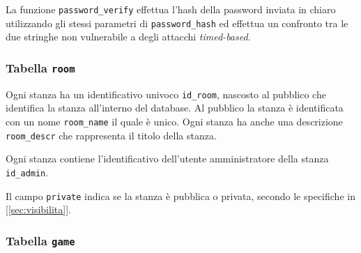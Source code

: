 La funzione \texttt{password\_verify} effettua l'hash della password inviata in chiaro utilizzando gli stessi parametri di \texttt{password\_hash} ed effettua un confronto tra le due stringhe non vulnerabile a degli attacchi \emph{timed-based}.



\subsubsection{Tabella \texttt{room}}

Ogni stanza ha un identificativo univoco \texttt{id\_room}, nascosto al pubblico che identifica la stanza all'interno del database. Al pubblico la stanza è identificata con un nome \texttt{room\_name} il quale è unico. Ogni stanza ha anche una descrizione \texttt{room\_descr} che rappresenta il titolo della stanza. 

Ogni stanza contiene l'identificativo dell'utente amministratore della stanza \texttt{id\_admin}. 

Il campo \texttt{private} indica se la stanza è pubblica o privata, secondo le specifiche in [\ref{sec:visibilita}].



\subsubsection{Tabella \texttt{game}}


